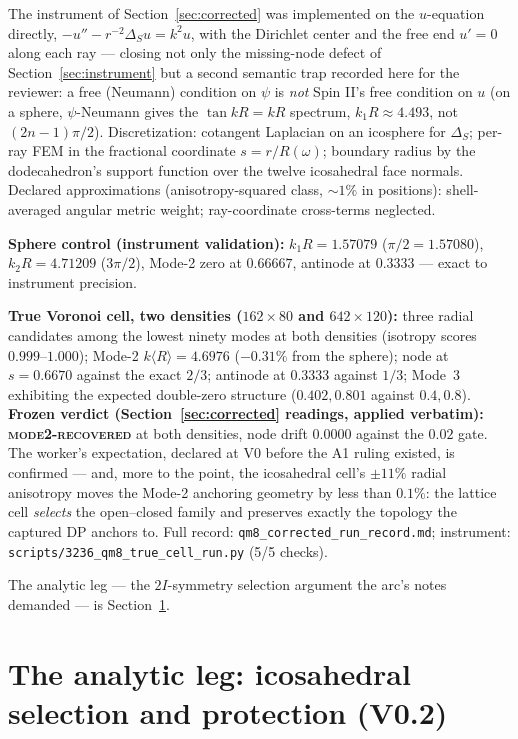 \documentclass[12pt]{article}
\begin{document}
The instrument of Section~\ref{sec:corrected} was implemented on the
$u$-equation directly, $-u'' - r^{-2}\Delta_S u = k^2 u$, with the
Dirichlet center and the free end $u'=0$ along each ray --- closing not
only the missing-node defect of Section~\ref{sec:instrument} but a
second semantic trap recorded here for the reviewer: a free (Neumann)
condition on $\psi$ is \emph{not} Spin II's free condition on $u$ (on
a sphere, $\psi$-Neumann gives the $\tan kR = kR$ spectrum,
$k_1R \approx 4.493$, not $(2n-1)\pi/2$).  Discretization: cotangent
Laplacian on an icosphere for $\Delta_S$; per-ray FEM in the
fractional coordinate $s = r/R(\omega)$; boundary radius by the
dodecahedron's support function over the twelve icosahedral face
normals.  Declared approximations (anisotropy-squared class,
$\sim1\%$ in positions): shell-averaged angular metric weight;
ray-coordinate cross-terms neglected.

\textbf{Sphere control (instrument validation):} $k_1 R = 1.57079$
($\pi/2 = 1.57080$), $k_2 R = 4.71209$ ($3\pi/2$), Mode-2 zero at
$0.66667$, antinode at $0.3333$ --- exact to instrument precision.

\textbf{True Voronoi cell, two densities ($162\times80$ and
$642\times120$):} three radial candidates among the lowest ninety
modes at both densities (isotropy scores $0.999$--$1.000$); Mode-2
$k\langle R\rangle = 4.6976$ ($-0.31\%$ from the sphere); node at
$s = 0.6670$ against the exact $2/3$; antinode at $0.3333$ against
$1/3$; Mode~3 exhibiting the expected double-zero structure
($0.402, 0.801$ against $0.4, 0.8$).  \textbf{Frozen verdict
(Section~\ref{sec:corrected} readings, applied verbatim):
\textsc{mode2-recovered}} at both densities, node drift $0.0000$
against the $0.02$ gate.  The worker's expectation, declared at V0
before the A1 ruling existed, is confirmed --- and, more to the point,
the icosahedral cell's $\pm11\%$ radial anisotropy moves the Mode-2
anchoring geometry by less than $0.1\%$: the lattice cell
\emph{selects} the open--closed family and preserves exactly the
topology the captured DP anchors to.  Full record:
\texttt{qm8\_corrected\_run\_record.md}; instrument:
\texttt{scripts/3236\_qm8\_true\_cell\_run.py} (5/5 checks).

The analytic leg --- the $2I$-symmetry selection argument the arc's
notes demanded --- is Section~\ref{sec:analytic}.

\section{The analytic leg: icosahedral selection and protection (V0.2)}
\label{sec:analytic}
\end{document}
